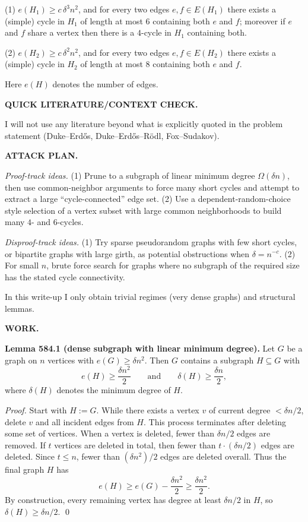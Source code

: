 (1) $e(H_1)\ge c\,\delta^3 n^2$, and for every two edges $e,f\in E(H_1)$ there exists a (simple) cycle in $H_1$ of length at most $6$ containing both $e$ and $f$; moreover if $e$ and $f$ share a vertex then there is a $4$-cycle in $H_1$ containing both.

(2) $e(H_2)\ge c\,\delta^2 n^2$, and for every two edges $e,f\in E(H_2)$ there exists a (simple) cycle in $H_2$ of length at most $8$ containing both $e$ and $f$.

Here $e(H)$ denotes the number of edges.

\bigskip
\noindent\textbf{QUICK LITERATURE/CONTEXT CHECK.}

I will not use any literature beyond what is explicitly quoted in the problem statement (Duke--Erd\H{o}s, Duke--Erd\H{o}s--R\"{o}dl, Fox--Sudakov).

\bigskip
\noindent\textbf{ATTACK PLAN.}

\emph{Proof-track ideas.}
(1) Prune to a subgraph of linear minimum degree $\Omega(\delta n)$, then use common-neighbor arguments to force many short cycles and attempt to extract a large ``cycle-connected'' edge set.
(2) Use a dependent-random-choice style selection of a vertex subset with large common neighborhoods to build many $4$- and $6$-cycles.

\emph{Disproof-track ideas.}
(1) Try sparse pseudorandom graphs with few short cycles, or bipartite graphs with large girth, as potential obstructions when $\delta=n^{-c}$.
(2) For small $n$, brute force search for graphs where no subgraph of the required size has the stated cycle connectivity.

In this write-up I only obtain trivial regimes (very dense graphs) and structural lemmas.

\bigskip
\noindent\textbf{WORK.}

\noindent\textbf{Lemma 584.1 (dense subgraph with linear minimum degree).}
Let $G$ be a graph on $n$ vertices with $e(G)\ge \delta n^2$.
Then $G$ contains a subgraph $H\subseteq G$ with
\[
 e(H)\ge \frac{\delta n^2}{2}
 \qquad\text{and}\qquad
 \delta(H)\ge \frac{\delta n}{2},
\]
where $\delta(H)$ denotes the minimum degree of $H$.

\noindent\emph{Proof.}
Start with $H:=G$.
While there exists a vertex $v$ of current degree $<\delta n/2$, delete $v$ and all incident edges from $H$.
This process terminates after deleting some set of vertices.
When a vertex is deleted, fewer than $\delta n/2$ edges are removed.
If $t$ vertices are deleted in total, then fewer than $t\cdot(\delta n/2)$ edges are deleted.
Since $t\le n$, fewer than $(\delta n^2)/2$ edges are deleted overall.
Thus the final graph $H$ has
\[
 e(H)\ge e(G)-\frac{\delta n^2}{2}\ge \frac{\delta n^2}{2}.
\]
By construction, every remaining vertex has degree at least $\delta n/2$ in $H$, so $\delta(H)\ge \delta n/2$.
\qed

